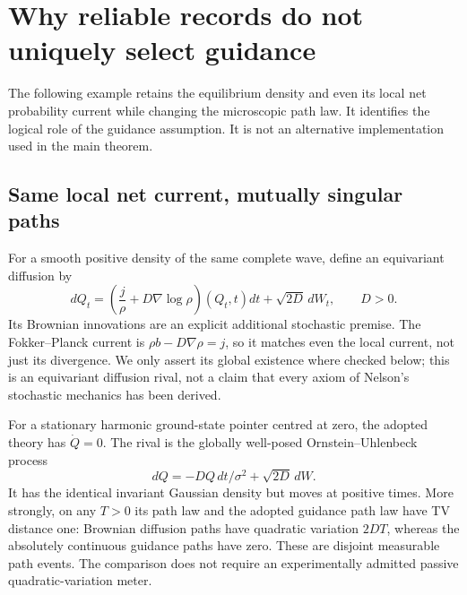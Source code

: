 \documentclass[11pt]{article}
\theoremstyle{definition}\newtheorem{assumption}[theorem]{Constitutive assumption}
\theoremstyle{remark}\newtheorem{remark}[theorem]{Remark}
\begin{document}
\section{Why reliable records do not uniquely select guidance}
\label{sec:rivals}
The following example retains the equilibrium density and even its local net probability current while changing the microscopic path law. It identifies the logical role of the guidance assumption. It is not an alternative implementation used in the main theorem.

\subsection{Same local net current, mutually singular paths}
For a smooth positive density of the same complete wave, define an equivariant diffusion by
\begin{equation}\label{eq:diffusion}
 dQ_t=\left(\frac j\rho+D\nabla\log\rho\right)(Q_t,t)dt
                                   +\sqrt{2D}\,dW_t,
 \qquad D>0.
\end{equation}
Its Brownian innovations are an explicit additional stochastic premise. The Fokker--Planck current is $\rho b-D\nabla\rho=j$, so it matches even the local current, not just its divergence. We only assert its global existence where checked below; this is an equivariant diffusion rival, not a claim that every axiom of Nelson's stochastic mechanics has been derived.

For a stationary harmonic ground-state pointer centred at zero, the adopted theory has $\dot Q=0$. The rival is the globally well-posed Ornstein--Uhlenbeck process
\[
 dQ=-D Q\,dt/\sigma^2+\sqrt{2D}\,dW.
\]
It has the identical invariant Gaussian density but moves at positive times. More strongly, on any $T>0$ its path law and the adopted guidance path law have TV distance one: Brownian diffusion paths have quadratic variation $2DT$, whereas the absolutely continuous guidance paths have zero. These are disjoint measurable path events. The comparison does not require an experimentally admitted passive quadratic-variation meter.
\end{document}
